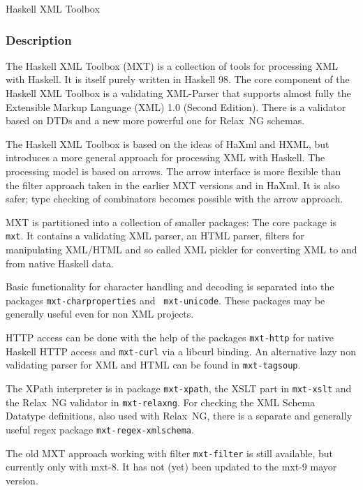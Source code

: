 \begin{hcarentry}[updated]{Haskell XML Toolbox}
\label{mxt}
\makeheader

\subsubsection*{Description}

The Haskell XML Toolbox (MXT) is a collection of tools for processing XML with
Haskell. It is itself purely written in Haskell 98. The core component of the
Haskell XML Toolbox is a validating XML-Parser that supports
almost fully the Extensible Markup Language (XML) 1.0 (Second Edition).
There is a validator based on DTDs and a new more powerful one for
Relax~NG schemas.

The Haskell XML Toolbox is based on the ideas of HaXml %
and HXML,
but introduces a more general approach for processing XML with Haskell.
The processing model is based on arrows. The arrow interface is more flexible
than the filter approach taken in the earlier MXT versions and in HaXml.
It is also safer; type checking of combinators becomes possible with the arrow
approach.

MXT is partitioned into a collection of smaller packages: The core
package is
{\tt mxt}. It contains a validating XML parser, an HTML parser,
filters for manipulating XML/HTML and so called XML pickler for
converting XML to and from native Haskell data.

Basic functionality for character handling and decoding is
separated into the packages {\tt mxt-charproperties} and {\tt
 mxt-unicode}. These packages may be generally useful even for non XML projects.

HTTP access can be done with the help of the packages
{\tt mxt-http} for native Haskell HTTP access and {\tt mxt-curl} via a
libcurl binding. An alternative lazy non validating parser for XML and HTML can be
found in {\tt mxt-tagsoup}. 

The XPath interpreter is in package {\tt mxt-xpath}, the XSLT part in
{\tt mxt-xslt}
and the Relax~NG validator in {\tt mxt-relaxng}. For checking the XML
Schema Datatype definitions, also used with Relax~NG, there is a
separate and generally useful regex package {\tt mxt-regex-xmlschema}.

The old MXT approach working with filter {\tt mxt-filter} is still
available,
but currently only with mxt-8. It has not (yet) been updated to the
mxt-9 mayor version.


\end{hcarentry}
